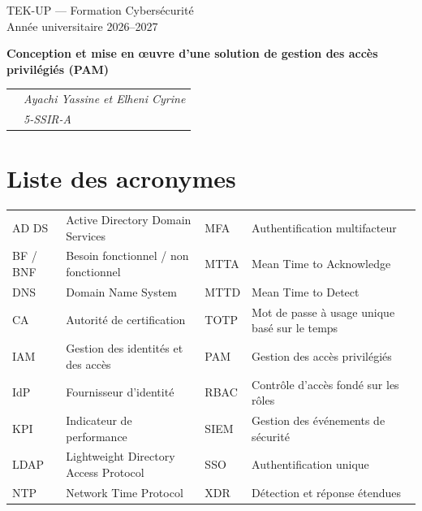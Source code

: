 \documentclass[11pt,a4paper]{report}
\begin{document}
\begin{titlepage}
\centering
\vspace*{1.5cm}
{\large TEK-UP --- Formation Cybersécurité\\Année universitaire 2026--2027\par}
\vspace{2cm}
{\Huge\bfseries Conception et mise en œuvre d'une solution de gestion des accès privilégiés (PAM)\par}
\vspace{1.2cm}
{
\begin{tabular}{rl}

 & \emph{Ayachi Yassine et Elheni Cyrine}\\
  & \emph{5-SSIR-A}\\

\end{tabular}}
\vfill
\end{titlepage}

\tableofcontents

\chapter*{Liste des acronymes}
\small
\begin{tabularx}{\textwidth}{@{}l X l X@{}}
AD DS & Active Directory Domain Services & MFA & Authentification multifacteur\\
BF / BNF & Besoin fonctionnel / non fonctionnel & MTTA & Mean Time to Acknowledge\\
DNS & Domain Name System & MTTD & Mean Time to Detect\\
CA & Autorité de certification & TOTP & Mot de passe à usage unique basé sur le temps\\
IAM & Gestion des identités et des accès & PAM & Gestion des accès privilégiés\\
IdP & Fournisseur d'identité & RBAC & Contrôle d'accès fondé sur les rôles\\
KPI & Indicateur de performance & SIEM & Gestion des événements de sécurité\\
LDAP & Lightweight Directory Access Protocol & SSO & Authentification unique\\
NTP & Network Time Protocol & XDR & Détection et réponse étendues\\
\end{tabularx}
\normalsize
\end{document}
